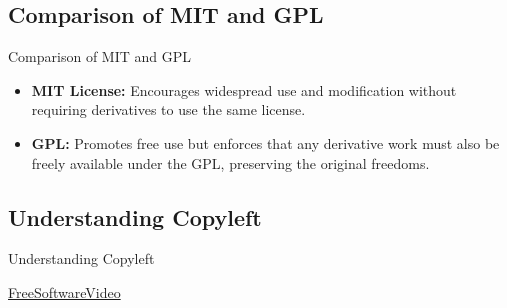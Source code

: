 \documentclass[10pt]{beamer}
\begin{document}
\subsection{Comparison of MIT and GPL}
\begin{frame}{Comparison of MIT and GPL}
    \begin{itemize}
        \item \textbf{MIT License:} Encourages widespread use and modification without requiring derivatives to use the same license.
        \item \textbf{GPL:} Promotes free use but enforces that any derivative work must also be freely available under the GPL, preserving the original freedoms.
    \end{itemize}
\end{frame}
\subsection{Understanding Copyleft}

\begin{frame}{Understanding Copyleft}
\textcolor{myNewColorA}{\Huge{\centerline{\href{https://www.fsf.org/blogs/community/help-others-find-free-software-watch-and-share-escape-to-freedom}{FreeSoftwareVideo}}}}

\end{frame}
\end{document}
